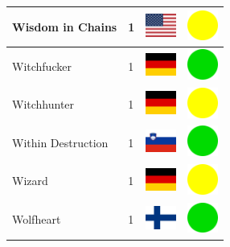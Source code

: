 \documentclass[12pt, a4paper, twoside]{report}
\begin{document}
\begin{center}
\begin{longtable}{|p{5cm}|p{2cm}|p{2cm}|p{2cm}|}
			Wisdom in Chains & 1 & \includegraphics[width=1cm]{4x3/us} & \includegraphics[width=1cm]{likes/m} \\ \hline
			Witchfucker & 1 & \includegraphics[width=1cm]{4x3/de} & \includegraphics[width=1cm]{likes/y} \\ \hline
			Witchhunter & 1 & \includegraphics[width=1cm]{4x3/de} & \includegraphics[width=1cm]{likes/m} \\ \hline
			Within Destruction & 1 & \includegraphics[width=1cm]{4x3/si} & \includegraphics[width=1cm]{likes/y} \\ \hline
			Wizard & 1 & \includegraphics[width=1cm]{4x3/de} & \includegraphics[width=1cm]{likes/m} \\ \hline
			Wolfheart & 1 & \includegraphics[width=1cm]{4x3/fi} & \includegraphics[width=1cm]{likes/y} \\ \hline

\end{longtable}
\end{center}
\end{document}
